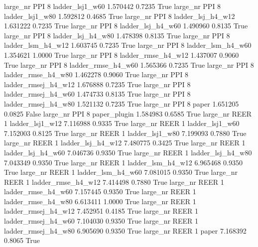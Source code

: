   large_nr      PPI                 8     ladder_lsj1_w60   1.570442      0.7235    True
  large_nr      PPI                 8     ladder_lsj1_w80   1.592812      0.4685    True
  large_nr      PPI                 8   ladder_lsj_h4_w12   1.631222      0.7235    True
  large_nr      PPI                 8   ladder_lsj_h4_w60   1.490960      0.8135    True
  large_nr      PPI                 8   ladder_lsj_h4_w80   1.478398      0.8135    True
  large_nr      PPI                 8   ladder_lsm_h4_w12   1.603745      0.7235    True
  large_nr      PPI                 8   ladder_lsm_h4_w60   1.354621      1.0000    True
  large_nr      PPI                 8  ladder_rmse_h4_w12   1.437007      0.9060    True
  large_nr      PPI                 8  ladder_rmse_h4_w60   1.565366      0.7235    True
  large_nr      PPI                 8  ladder_rmse_h4_w80   1.462278      0.9060    True
  large_nr      PPI                 8 ladder_rmsej_h4_w12   1.676888      0.7235    True
  large_nr      PPI                 8 ladder_rmsej_h4_w60   1.474733      0.8135    True
  large_nr      PPI                 8 ladder_rmsej_h4_w80   1.521132      0.7235    True
  large_nr      PPI                 8               paper   1.651205      0.0825   False
  large_nr      PPI                 8        paper_plugin   1.584983      0.6585    True
  large_nr     REER                 1     ladder_lsj1_w12   7.116988      0.9335    True
  large_nr     REER                 1     ladder_lsj1_w60   7.152003      0.8125    True
  large_nr     REER                 1     ladder_lsj1_w80   7.199093      0.7880    True
  large_nr     REER                 1   ladder_lsj_h4_w12   7.480775      0.3425    True
  large_nr     REER                 1   ladder_lsj_h4_w60   7.046736      0.9350    True
  large_nr     REER                 1   ladder_lsj_h4_w80   7.043349      0.9350    True
  large_nr     REER                 1   ladder_lsm_h4_w12   6.965468      0.9350    True
  large_nr     REER                 1   ladder_lsm_h4_w60   7.081015      0.9350    True
  large_nr     REER                 1  ladder_rmse_h4_w12   7.414498      0.7880    True
  large_nr     REER                 1  ladder_rmse_h4_w60   7.157445      0.9350    True
  large_nr     REER                 1  ladder_rmse_h4_w80   6.613411      1.0000    True
  large_nr     REER                 1 ladder_rmsej_h4_w12   7.452951      0.4185    True
  large_nr     REER                 1 ladder_rmsej_h4_w60   7.104030      0.9350    True
  large_nr     REER                 1 ladder_rmsej_h4_w80   6.905690      0.9350    True
  large_nr     REER                 1               paper   7.168392      0.8065    True
